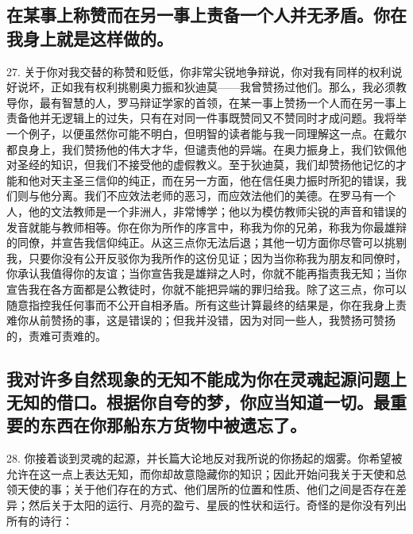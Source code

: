 
\subsection{在某事上称赞而在另一事上责备一个人并无矛盾。你在我身上就是这样做的。}

27. 关于你对我交替的称赞和贬低，你非常尖锐地争辩说，你对我有同样的权利说好说坏，正如我有权利挑剔奥力振和狄迪莫——我曾赞扬过他们。那么，我必须教导你，最有智慧的人，罗马辩证学家的首领，在某一事上赞扬一个人而在另一事上责备他并无逻辑上的过失，只有在对同一件事既赞同又不赞同时才成问题。我将举一个例子，以便虽然你可能不明白，但明智的读者能与我一同理解这一点。在戴尔都良身上，我们赞扬他的伟大才华，但谴责他的异端。在奥力振身上，我们钦佩他对圣经的知识，但我们不接受他的虚假教义。至于狄迪莫，我们却赞扬他记忆的才能和他对天主圣三信仰的纯正，而在另一方面，他在信任奥力振时所犯的错误，我们则与他分离。我们不应效法老师的恶习，而应效法他们的美德。在罗马有一个人，他的文法教师是一个非洲人，非常博学；他以为模仿教师尖锐的声音和错误的发音就能与教师相等。你在你为所作的序言中，称我为你的兄弟，称我为你最雄辩的同僚，并宣告我信仰纯正。从这三点你无法后退；其他一切方面你尽管可以挑剔我，只要你没有公开反驳你为我所作的这份见证；因为当你称我为朋友和同僚时，你承认我值得你的友谊；当你宣告我是雄辩之人时，你就不能再指责我无知；当你宣告我在各方面都是公教徒时，你就不能把异端的罪归给我。除了这三点，你可以随意指控我任何事而不公开自相矛盾。所有这些计算最终的结果是，你在我身上责难你从前赞扬的事，这是错误的；但我并没错，因为对同一些人，我赞扬可赞扬的，责难可责难的。\par


\subsection{我对许多自然现象的无知不能成为你在灵魂起源问题上无知的借口。根据你自夸的梦，你应当知道一切。最重要的东西在你那船东方货物中被遗忘了。}

28. 你接着谈到灵魂的起源，并长篇大论地反对我所说的你扬起的烟雾。你希望被允许在这一点上表达无知，而你却故意隐藏你的知识；因此开始问我关于天使和总领天使的事；关于他们存在的方式、他们居所的位置和性质、他们之间是否存在差异；然后关于太阳的运行、月亮的盈亏、星辰的性状和运行。奇怪的是你没有列出所有的诗行：\par

